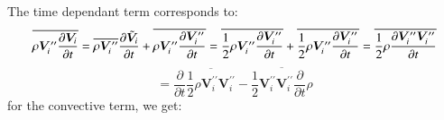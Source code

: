 \documentclass{warpdoc}
\newcommand{\mfc}{\textstyle}
\newcommand{\mfd}{\displaystyle}
\begin{document}
The time dependant term corresponds to:
%
\begin{displaymath}
    \mfd\overline{\rho \bm{V}_i^{\prime\prime} \frac{\partial \bm{V}_i }{\partial t}}
     =  \mfd\overline{\rho \bm{V}_i^{\prime\prime}} \frac{\partial {\wtilde{\bm{V}}_i} }{\partial t}
          +\overline{\rho \bm{V}_i^{\prime\prime} \frac{\partial \bm{V}_i^{\prime\prime} }{\partial t} }
     =  \mfd \overline{\frac{1}{2} \rho \bm{V}_i^{\prime\prime} \frac{\partial \bm{V}_i^{\prime\prime} }{\partial t} }
                 +\overline{\frac{1}{2} \rho \bm{V}_i^{\prime\prime} \frac{\partial \bm{V}_i^{\prime\prime} }{\partial t} }
     =  \mfd \overline{\frac{1}{2}\rho \frac{\partial \bm{V}_i^{\prime\prime} \bm{V}_i^{\prime\prime}}{\partial t} }
\end{displaymath}
%
\begin{displaymath}
   =  \mfd \frac{\partial }{\partial t} \overline{{\mfc\frac{1}{2}}\rho \bm{V}_i^{\prime\prime} \bm{V}_i^{\prime\prime} }
     -\overline{\frac{1}{2}\bm{V}_i^{\prime\prime} \bm{V}_i^{\prime\prime}\frac{\partial }{\partial t} \rho }
\end{displaymath}
%
for the convective term, we get:
%
\end{document}
